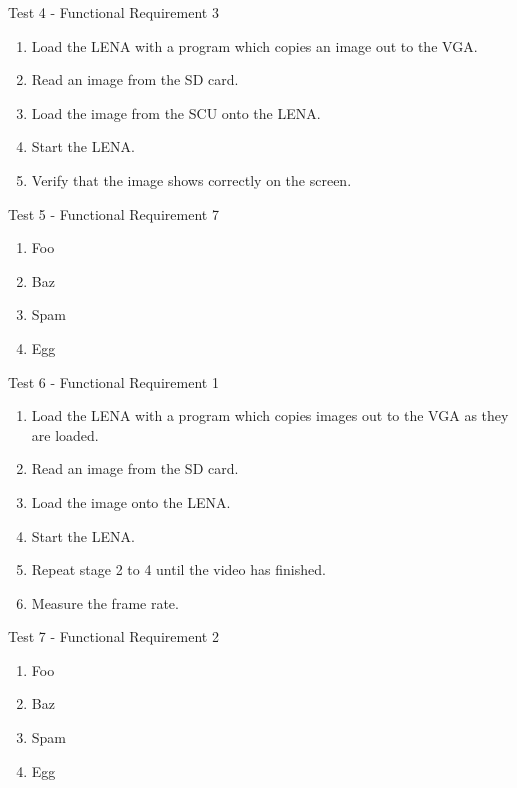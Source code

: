 {\sc Test 4 - Functional Requirement 3}

{\em \FRIII}

\begin{enumerate}
\item Load the \ac{LENA} with a program which copies an image out to the
  \ac{VGA}.
\item Read an image from the \ac{SD} card.
\item Load the image from the \ac{SCU} onto the \ac{LENA}.
\item Start the \ac{LENA}.
\item Verify that the image shows correctly on the screen.
\end{enumerate}

{\sc Test 5 - Functional Requirement 7}

{\em \FRVII}

\begin{enumerate}
\item Foo
\item Baz
\item Spam
\item Egg
\end{enumerate}

{\sc Test 6 - Functional Requirement 1}

{\em \FRI}

\begin{enumerate}
\item Load the \ac{LENA} with a program which copies images out to the \ac{VGA}
  as they are loaded.
\item Read an image from the \ac{SD} card.
\item Load the image onto the \ac{LENA}.
\item Start the \ac{LENA}.
\item Repeat stage 2 to 4 until the video has finished.
\item Measure the frame rate.
\end{enumerate}

{\sc Test 7 - Functional Requirement 2}

{\em \FRII}

\begin{enumerate}
\item Foo
\item Baz
\item Spam
\item Egg
\end{enumerate}
